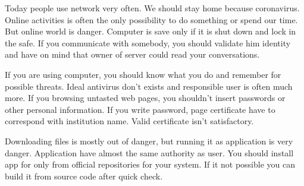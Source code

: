 \documentclass[a4paper,12pt]{article}
\begin{document}
\maketitle
\parskip=10pt
\parindent=0pt

Today people use network very often.
We should stay home because coronavirus.
Online activities is often the only possibility to do something or spend our time.
But online world is danger. 
Computer is save only if
it is shut down and lock in the safe.
If you communicate with somebody, you should validate him identity
and have on mind that
owner of server could read your conversations.

If you are using computer, you should know what you do
and remember for possible threats.
Ideal antivirus don't exists and responsible user
is often much more.
If you browsing untasted web pages, you shouldn't insert
passwords or other personal information.
If you write password, page certificate have to 
correspond with institution name.
Valid certificate isn't satisfactory.

Downloading files is mostly out of danger,
but running it as application is very danger.
Application have almost the same authority as user.
You should install app for only
from official repositories for your system.
If it not possible you can build it from source code
after quick check.
\end{document}
